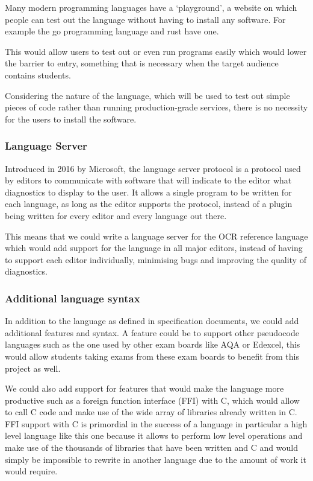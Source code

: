 \documentclass{article}
\begin{document}
Many modern programming languages have a `playground', a website on which
people can test out the language without having to install any software. For
example the go programming language and rust have one\cite{rustPlayground,
goPlayground}.

This would allow users to test out or even run programs easily which would
lower the barrier to entry, something that is necessary when the target
audience contains students.

Considering the nature of the language, which will be used to test out simple
pieces of code rather than running production-grade services, there is no
necessity for the users to install the software.

\subsubsection{Language Server}

Introduced in 2016 by Microsoft, the language server protocol is a protocol
used by editors to communicate with software that will indicate to the editor
what diagnostics to display to the user. It allows a single program to be
written for each language, as long as the editor supports the protocol, instead
of a plugin being written for every editor and every language out there.

This means that we could write a language server for the OCR reference language
which would add support for the language in all major editors, instead of
having to support each editor individually, minimising bugs and improving the
quality of diagnostics.

\subsubsection{Additional language syntax}

In addition to the language as defined in specification documents, we could add
additional features and syntax. A feature could be to support other pseudocode
languages such as the one used by other exam boards like AQA or Edexcel, this
would allow students taking exams from these exam boards to benefit from this
project as well.

We could also add support for features that would make the language more
productive such as a foreign function interface (FFI) with C, which would allow
to call C code and make use of the wide array of libraries already written in
C. FFI support with C is primordial in the success of a language in particular
a high level language like this one because it allows to perform low level
operations and make use of the thousands of libraries that have been written
and C and would simply be impossible to rewrite in another language due to the
amount of work it would require.
\end{document}
